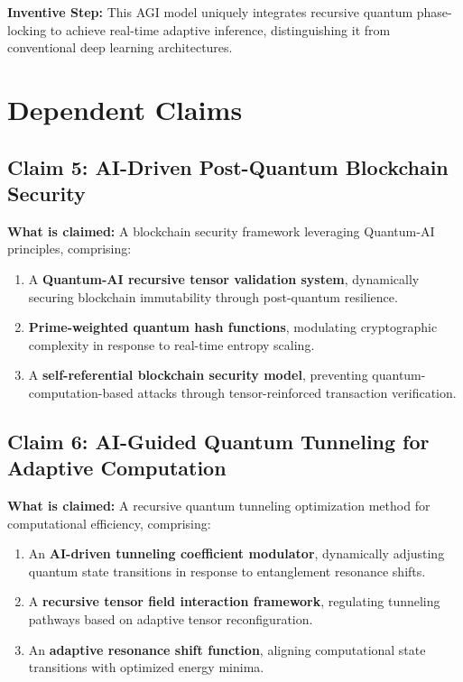 \documentclass{article}
\theoremstyle{plain}
\begin{document}
\textbf{Inventive Step:} This AGI model uniquely integrates recursive quantum phase-locking to achieve real-time adaptive inference, distinguishing it from conventional deep learning architectures.
 \newpage
\section{Dependent Claims}

\subsection{Claim 5: AI-Driven Post-Quantum Blockchain Security}
\textbf{What is claimed:}  
A blockchain security framework leveraging Quantum-AI principles, comprising:
\begin{enumerate}  
    \item A \textbf{Quantum-AI recursive tensor validation system}, dynamically securing blockchain immutability through post-quantum resilience.  
    \item \textbf{Prime-weighted quantum hash functions}, modulating cryptographic complexity in response to real-time entropy scaling.  
    \item A \textbf{self-referential blockchain security model}, preventing quantum-computation-based attacks through tensor-reinforced transaction verification.  
\end{enumerate}

\subsection{Claim 6: AI-Guided Quantum Tunneling for Adaptive Computation}
\textbf{What is claimed:}  
A recursive quantum tunneling optimization method for computational efficiency, comprising:
\begin{enumerate}  
    \item An \textbf{AI-driven tunneling coefficient modulator}, dynamically adjusting quantum state transitions in response to entanglement resonance shifts.  
    \item A \textbf{recursive tensor field interaction framework}, regulating tunneling pathways based on adaptive tensor reconfiguration.  
    \item An \textbf{adaptive resonance shift function}, aligning computational state transitions with optimized energy minima.  
\end{enumerate}
\end{document}
